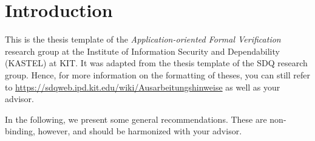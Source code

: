 
\chapter{Introduction}
\label{ch:Introduction}


This is the thesis template of the \emph{Application-oriented Formal Verification}
research group at the Institute of Information Security and Dependability (KASTEL) at KIT. It was adapted
from the thesis template of the SDQ research group.
Hence, for more information on the formatting of theses, you can still refer to
\url{https://sdqweb.ipd.kit.edu/wiki/Ausarbeitungshinweise} as well as your advisor.


In the following, we present some general recommendations.
These are non-binding, however, and should be harmonized with your advisor.

% 

  
% 
%        
% 
% 
%     
% 
%     
% 
%     

